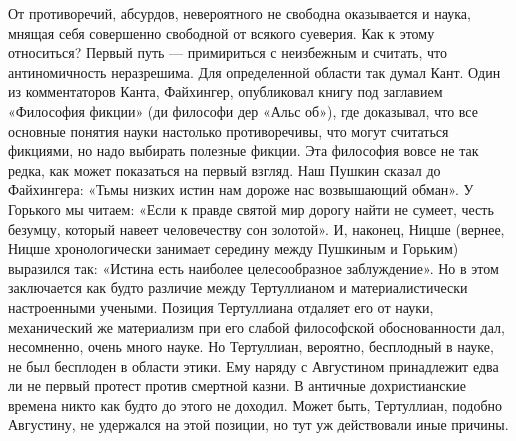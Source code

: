 От противоречий, абсурдов, невероятного не свободна оказывается и наука, мнящая
себя совершенно свободной от всякого суеверия. Как к этому относиться? Первый
путь --- примириться с неизбежным и считать, что антиномичность неразрешима. Для
определенной области так думал Кант. Один из комментаторов Канта, Файхингер,
опубликовал книгу под заглавием «Философия фикции» (ди философи дер «Альс об»),
где доказывал, что все основные понятия науки настолько противоречивы, что
могут считаться фикциями, но надо выбирать полезные фикции. Эта философия вовсе
не так редка, как может показаться на первый взгляд. Наш Пушкин сказал до
Файхингера: «Тьмы низких истин нам дороже нас возвышающий обман». У Горького мы
читаем: «Если к правде святой мир дорогу найти не сумеет, честь безумцу,
который навеет человечеству сон золотой». И, наконец, Ницше (вернее, Ницше
хронологически занимает середину между Пушкиным и Горьким) выразился так:
«Истина есть наиболее целесообразное заблуждение». Но в этом заключается как
будто различие между Тертуллианом и материалистически настроенными учеными.
Позиция Тертуллиана отдаляет его от науки, механический же материализм при его
слабой философской обоснованности дал, несомненно, очень много науке. Но
Тертуллиан, вероятно, бесплодный в науке, не был бесплоден в области этики. Ему
наряду с Августином принадлежит едва ли не первый протест против смертной
казни. В античные дохристианские времена никто как будто до этого не доходил.
Может быть, Тертуллиан, подобно Августину, не удержался на этой позиции, но тут
уж действовали иные причины.

